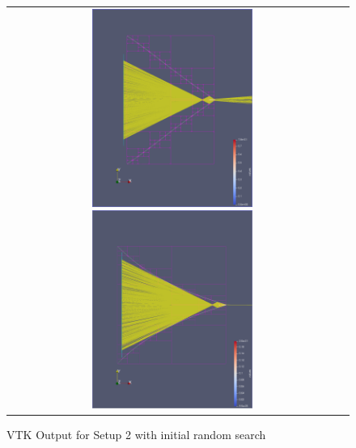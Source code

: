 \documentclass[a4paper,10pt]{article}
\begin{document}
    \begin{figure}
        \centering
        \begin{tabular}{c c}
        \includegraphics[width=0.5\textwidth]{images/open_rand/start.png}
        \includegraphics[width=0.5\textwidth]{images/open_rand/0.png}
        \end{tabular}
        \label{fig:setup2_rand}
        \caption[VTK Output for Setup 2 with initial random search]{
            VTK Output for Setup 2 with initial random search
            }
    \end{figure}
\end{document}
